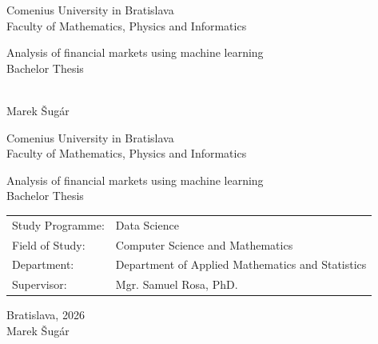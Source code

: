 \documentclass[12pt, oneside]{book}  %
\def\mfrok{2026}
\def\mfnazov{Analysis of financial markets using machine learning}
\def\mftyp{Bachelor Thesis}
\def\mfautor{Marek Šugár}
\def\mfskolitel{Mgr. Samuel Rosa, PhD.}
\def\mfmiesto{Bratislava, \mfrok}
\def\mfodbor{ Computer Science and Mathematics }
\def\program{ Data Science }
\def\mfpracovisko{ Department of Applied Mathematics and Statistics  }
\begin{document}
   

\frontmatter
\pagestyle{empty}


\begin{center}
  \sc\large
  Comenius University in Bratislava\\
  Faculty of Mathematics, Physics and Informatics

\vfill

{\LARGE\mfnazov}\\
\mftyp
\end{center}

\vfill

{\sc\large 
\noindent \mfrok\\
\mfautor
}

\cleardoublepage


\noindent

\begin{center}
\sc  
\large
  Comenius University in Bratislava\\
  Faculty of Mathematics, Physics and Informatics

\vfill

{\LARGE\mfnazov}\\
\mftyp
\end{center}

\vfill

\noindent
\begin{tabular}{ll}
Study Programme: & \program \\
Field of Study: & \mfodbor \\
Department: & \mfpracovisko \\
Supervisor: & \mfskolitel \\
\end{tabular}

\vfill


\noindent \mfmiesto\\
\mfautor

\cleardoublepage



\newpage
\setcounter{page}{3}
\end{document}
